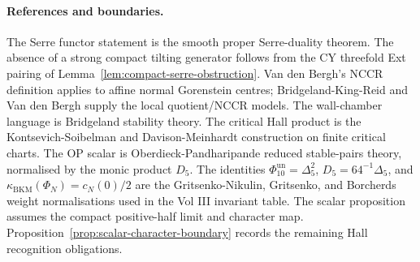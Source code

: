 \documentclass[11pt]{article}
\providecommand{\NCCR}{\mathrm{NCCR}}
\providecommand{\DeltaFive}{\Delta_{5}}
\providecommand{\Dfive}{D_{5}}
\providecommand{\PhiTenUn}{\Phi_{10}^{\mathrm{un}}}
\providecommand{\kBKM}{\kappa_{\mathrm{BKM}}}
\theoremstyle{plain}
\theoremstyle{definition}
\begin{document}
\paragraph*{References and boundaries.}
The Serre functor statement is the smooth proper Serre-duality theorem.
The absence of a strong compact tilting generator follows from the
CY threefold Ext pairing of Lemma~\ref{lem:compact-serre-obstruction}.
Van den Bergh's \(\NCCR\) definition applies to affine normal
Gorenstein centres; Bridgeland-King-Reid and Van den Bergh supply the
local quotient/NCCR models. The wall-chamber language is Bridgeland
stability theory. The critical Hall product is the Kontsevich-Soibelman
and Davison-Meinhardt construction on finite critical charts. The OP
scalar is Oberdieck-Pandharipande reduced stable-pairs theory,
normalised by the monic product \(D_5\). The identities
\(\PhiTenUn=\DeltaFive^2\), \(\Dfive=64^{-1}\DeltaFive\), and
\(\kBKM(\Phi_N)=c_N(0)/2\) are the Gritsenko-Nikulin, Gritsenko, and
Borcherds weight normalisations used in the Vol III invariant table.
The scalar proposition assumes the compact
positive-half limit and character map. Proposition~\ref{prop:scalar-character-boundary}
records the remaining Hall recognition obligations.
\end{document}
